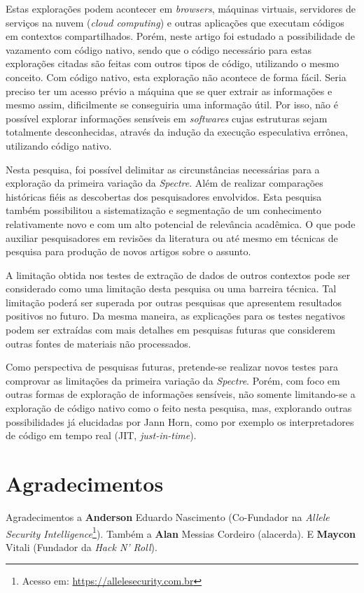 \documentclass[conference]{IEEEtran}
\begin{document}
Estas explorações podem acontecer em \emph{browsers}, máquinas virtuais, servidores de serviços na nuvem (\emph{cloud computing}) e outras aplicações que executam códigos em contextos compartilhados. Porém, neste artigo foi estudado a possibilidade de vazamento com código nativo, sendo que o código necessário para estas explorações citadas são feitas com outros tipos de código, utilizando o mesmo conceito. Com código nativo, esta exploração não acontece de forma fácil. Seria preciso ter um acesso prévio a máquina que se quer extrair as informações e mesmo assim, dificilmente se conseguiria uma informação útil. Por isso, não é possível explorar informações sensíveis em \emph{softwares} cujas estruturas sejam totalmente desconhecidas, através da indução da execução especulativa errônea, utilizando código nativo.

Nesta pesquisa, foi possível delimitar as circunstâncias necessárias para a exploração da primeira variação da \emph{Spectre}. Além de realizar comparações históricas fiéis as descobertas dos pesquisadores envolvidos. Esta pesquisa também possibilitou a sistematização e segmentação de um conhecimento relativamente novo e com um alto potencial de relevância acadêmica. O que pode auxiliar pesquisadores em revisões da literatura ou até mesmo em técnicas de pesquisa para produção de novos artigos sobre o assunto.

A limitação obtida nos testes de extração de dados de outros contextos pode ser considerado como uma limitação desta pesquisa ou uma barreira técnica. Tal limitação poderá ser superada por outras pesquisas que apresentem resultados positivos no futuro. Da mesma maneira, as explicações para os testes negativos podem ser extraídas com mais detalhes em pesquisas futuras que considerem outras fontes de materiais não processados.

Como perspectiva de pesquisas futuras, pretende-se realizar novos testes para comprovar as limitações da primeira variação da \emph{Spectre}. Porém, com foco em outras formas de exploração de informações sensíveis, não somente limitando-se a exploração de código nativo como o feito nesta pesquisa, mas, explorando outras possibilidades já elucidadas por Jann Horn, como por exemplo os interpretadores de código em tempo real (JIT, \emph{just-in-time}).

\section*{Agradecimentos}
Agradecimentos a \textbf{Anderson} Eduardo Nascimento (Co-Fundador na \emph{Allele Security Intelligence}\footnote{Acesso em: \url{https://allelesecurity.com.br}}). Também a \textbf{Alan} Messias Cordeiro (alacerda). E \textbf{Maycon} Vitali (Fundador da \emph{Hack N' Roll}).
\end{document}
